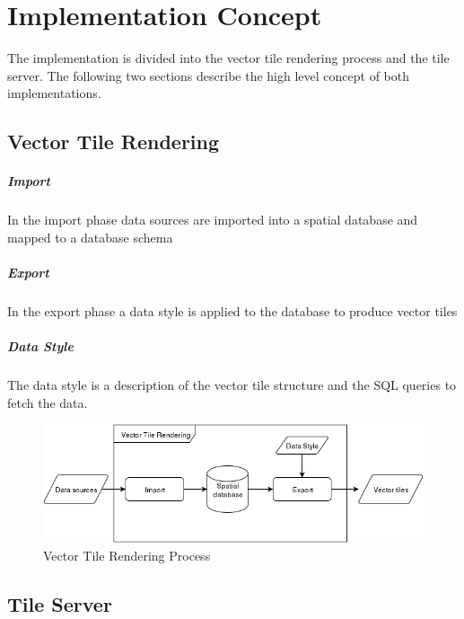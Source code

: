 \chapter{Implementation Concept}\label{implementation_concept}

The implementation is divided into the vector tile rendering process and the tile server. The following two sections describe the high level concept of both implementations.

\section{Vector Tile Rendering}

\paragraph{Import}
In the import phase data sources are imported into a spatial database and mapped to a database schema

\paragraph{Export}
In the export phase a data style is applied to the database to produce vector tiles 

\paragraph{Data Style}
The data style is a description of the vector tile structure and the SQL queries to fetch the data.

\begin{figure}[h]
  \centering
  \includegraphics[scale=0.6]{images/vector_tile_rendering_squashed.png}
  \caption{Vector Tile Rendering Process}
\end{figure}

\section{Tile Server}

